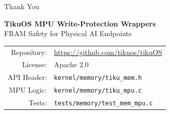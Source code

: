 \documentclass[aspectratio=169, 10pt]{beamer}
\begin{document}
\begin{frame}{Thank You}
\begin{center}
\Large\textbf{TikuOS MPU Write-Protection Wrappers}\\[0.5em]
\normalsize FRAM Safety for Physical AI Endpoints\\[1.5em]

\begin{tabular}{rl}
  Repository: & \url{https://github.com/tikuos/tikuOS} \\
  License:    & Apache 2.0 \\
  API Header: & \texttt{kernel/memory/tiku\_mem.h} \\
  MPU Logic:  & \texttt{kernel/memory/tiku\_mpu.c} \\
  Tests:      & \texttt{tests/memory/test\_mem\_mpu.c} \\
\end{tabular}
\end{center}
\end{frame}
\end{document}
